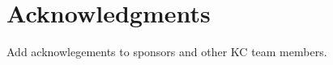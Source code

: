 \documentclass{ict4s_proc_article}
\begin{document}






\section{Acknowledgments}

Add acknowlegements to sponsors and other KC team members.



\balancecolumns
\end{document}
